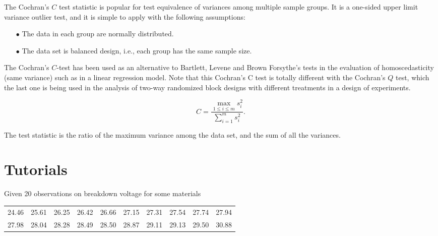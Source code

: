 The Cochran's $C$ test statistic is popular for test equivalence of variances among multiple sample groups.
It is a one-sided upper limit variance outlier test, and it is simple to apply with the following assumptions:
\begin{itemize}
    \item[$\bullet$] The data in each group are normally distributed.
    \item[$\bullet$] The data set is balanced design, i.e., each group has the same sample size.
\end{itemize}

The Cochran's $C$-test has been used as an alternative to Bartlett, Levene and Brown
Forsythe's tests in the evaluation of homoscedasticity (same 
variance) such as in a linear regression model. Note that  
this Cochran's C test is totally different with the Cochran's $Q$ test, which the last one is being used in the 
analysis of two-way randomized block designs with different treatments in a 
design of experiments.

\begin{equation}
    C = \frac{\displaystyle \max\limits_{1 \leq i \leq m} s^2_i}{\displaystyle \sum^m_{i=1} s^2_i}.
\end{equation}

The test statistic is the ratio of the maximum variance among the data set, and the sum of 
all the variances. 

\section*{Tutorials}

\begin{mdframed}
    \vspace{-0.25cm}
    \hspace{-0.25cm}
    \begin{Exercise}
        Given 20 observations on breakdown voltage for some materials
        \begin{center}
            \begin{tabular}{cccccccccc}
            24.46 & 25.61 & 26.25 & 26.42 & 26.66 & 27.15 & 27.31 & 27.54 & 27.74 & 27.94\\
            27.98 & 28.04 & 28.28 & 28.49 & 28.50 & 28.87 & 29.11 & 29.13 & 29.50 & 30.88\\
            \end{tabular}
        \end{center}
    \end{Exercise}
\end{mdframed}


